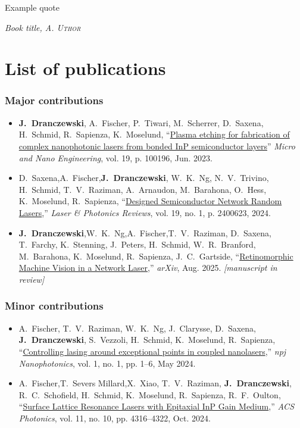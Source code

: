 \epigraph{Example quote}{\textit{Book title, \textsc{A. Uthor}}}

\lipsum[3-7]

\chapter*{List of publications}

\subsection*{Major contributions}
\begin{itemize}
	\item \textbf{J.~Dranczewski}, A.~Fischer, P.~Tiwari, M.~Scherrer, D.~Saxena, H.~Schmid, R.~Sapienza, K.~Moselund, ``\href{https://doi.org/10.1016/j.mne.2023.100196}{Plasma etching for fabrication of complex nanophotonic lasers from bonded InP semiconductor layers}'' \textit{Micro and Nano Engineering}, vol. 19, p. 100196, Jun. 2023.

	\item D.~Saxena,\footnotemark[1] A.~Fischer,\footnotemark[1] \textbf{J.~Dranczewski}, W.~K.~Ng, N.~V.~Trivino, H.~Schmid, T.~V.~Raziman, A.~Arnaudon, M.~Barahona, O.~Hess, K.~Moselund, R.~Sapienza, ``\href{https://doi.org/10.1002/lpor.202400623}{Designed Semiconductor Network Random Lasers},'' \textit{Laser \& Photonics Reviews}, vol. 19, no. 1, p. 2400623, 2024.

	\item \textbf{J.~Dranczewski},\footnotemark[1] W.~K.~Ng,\footnotemark[1] A.~Fischer,\footnotemark[1] T.~V.~Raziman, D.~Saxena, T.~Farchy, K.~Stenning, J.~Peters, H.~Schmid, W.~R.~Branford, M.~Barahona, K.~Moselund, R.~Sapienza, J.~C.~Gartside, ``\href{https://doi.org/10.48550/arXiv.2407.15558}{Retinomorphic Machine Vision in a Network Laser},'' \textit{arXiv}, Aug. 2025. \textit{[manuscript in review]}
\end{itemize}

\subsection*{Minor contributions}
\begin{itemize}
	\item A.~Fischer, T.~V.~Raziman, W.~K.~Ng, J.~Clarysse, D.~Saxena, \textbf{J.~Dranczewski}, S.~Vezzoli, H.~Schmid, K.~Moselund, R.~Sapienza, ``\href{https://doi.org/10.1038/s44310-024-00006-9}{Controlling lasing around exceptional points in coupled nanolasers},'' \textit{npj Nanophotonics}, vol. 1, no. 1, pp. 1–6, May 2024.
	\item A.~Fischer,\footnotemark[1] T.~Severs Millard,\footnotemark[1] X.~Xiao, T.~V.~Raziman, \textbf{J.~Dranczewski}, R.~C.~Schofield, H.~Schmid, K.~Moselund, R.~Sapienza, R.~F.~Oulton, ``\href{https://doi.org/10.1021/acsphotonics.4c01236}{Surface Lattice Resonance Lasers with
	Epitaxial InP Gain Medium},'' \textit{ACS Photonics}, vol. 11, no. 10, pp. 4316–4322, Oct. 2024.
\end{itemize}

